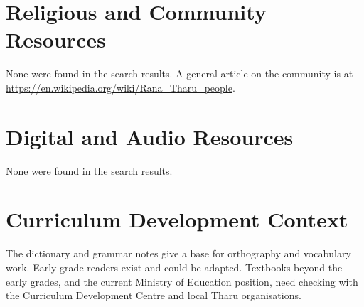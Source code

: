 \documentclass[12pt]{article}
\begin{document}
\section{Religious and Community Resources}
None were found in the search results. A general article on the community is at \url{https://en.wikipedia.org/wiki/Rana_Tharu_people}.

\section{Digital and Audio Resources}
None were found in the search results.

\section{Curriculum Development Context}
The dictionary and grammar notes give a base for orthography and vocabulary work. Early-grade readers exist and could be adapted. Textbooks beyond the early grades, and the current Ministry of Education position, need checking with the Curriculum Development Centre and local Tharu organisations.
\end{document}
